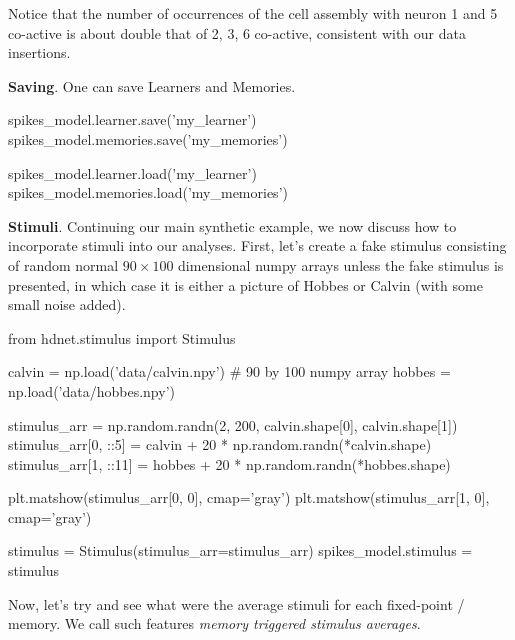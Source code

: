 \documentclass[letter, 12pt]{article}
\theoremstyle{definition}
\theoremstyle{remark}
\begin{document}
Notice that the number of occurrences of the cell assembly with neuron 1 and 5 co-active is about double that of 2, 3, 6 co-active, consistent with our data insertions.


\textbf{Saving}.  One can save Learners and Memories.

\begin{python}
spikes_model.learner.save('my_learner')
spikes_model.memories.save('my_memories')

spikes_model.learner.load('my_learner')
spikes_model.memories.load('my_memories')
\end{python}


\textbf{Stimuli}.   Continuing our main synthetic example, we now discuss how to incorporate stimuli into our analyses.   First, let's create a fake stimulus consisting of random normal $90 \times 100$ dimensional numpy arrays unless the fake stimulus is presented, in which case it is either a picture of Hobbes or Calvin (with some small noise added).

\begin{python}
from hdnet.stimulus import Stimulus

calvin = np.load('data/calvin.npy')  # 90 by 100 numpy array
hobbes = np.load('data/hobbes.npy')

stimulus_arr = np.random.randn(2, 200, calvin.shape[0], calvin.shape[1])
stimulus_arr[0, ::5] = calvin + 20 * np.random.randn(*calvin.shape)
stimulus_arr[1, ::11] = hobbes + 20 * np.random.randn(*hobbes.shape)

plt.matshow(stimulus_arr[0, 0], cmap='gray')
plt.matshow(stimulus_arr[1, 0], cmap='gray')

stimulus = Stimulus(stimulus_arr=stimulus_arr)
spikes_model.stimulus = stimulus
\end{python}

Now, let's try and see what were the average stimuli for each fixed-point / memory.  We call such features \textit{memory triggered stimulus averages}.
\end{document}
